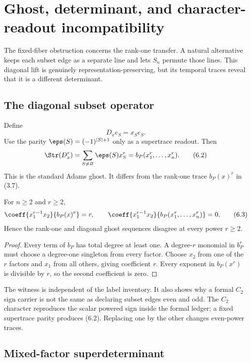 \section{Ghost, determinant, and character-readout incompatibility}
\label{sec:ghost}

The fixed-fiber obstruction concerns the rank-one transfer.  A natural
alternative keeps each subset edge as a separate line and lets $S_n$ permute
those lines.  This diagonal lift is genuinely representation-preserving, but
its temporal traces reveal that it is a different determinant.

\subsection{The diagonal subset operator}

Define
\[
  D_xe_S=x_Se_S.
  \tag{6.1}
\]
Use the parity $\eps(S)=(-1)^{|S|+1}$ only as a supertrace readout.  Then
\[
  \Str(D_x^r)
  =\sum_{S\ne\varnothing}\eps(S)x_S^r
  =b_P(x_1^r,\ldots,x_n^r).
  \tag{6.2}
\]
This is the standard Adams ghost.  It differs from the rank-one trace
$b_P(x)^r$ in (3.7).

\begin{theorem}
\label{thm:ghost-separation}
For $n\ge2$ and $r\ge2$,
\[
 \coeff{x_1^{r-1}x_2}{b_P(x)^r}=r,
 \qquad
 \coeff{x_1^{r-1}x_2}{b_P(x_1^r,\ldots,x_n^r)}=0.
 \tag{6.3}
\]
Hence the rank-one and diagonal ghost sequences disagree at every power
$r\ge2$.
\end{theorem}

\begin{proof}
Every term of $b_P$ has total degree at least one.  A degree-$r$ monomial in
$b_P^r$ must choose a degree-one singleton from every factor.  Choose $x_2$
from one of the $r$ factors and $x_1$ from all others, giving coefficient
$r$.  Every exponent in $b_P(x^r)$ is divisible by $r$, so the second
coefficient is zero.
\end{proof}

The witness is independent of the label inventory.  It also shows why a
formal $C_2$ sign carrier is not the same as declaring subset edges even and
odd.  The $C_2$ character reproduces the scalar powered sign inside the
formal ledger; a fixed supertrace parity produces (6.2).  Replacing one by
the other changes even-power traces.

\subsection{Mixed-factor superdeterminant}

